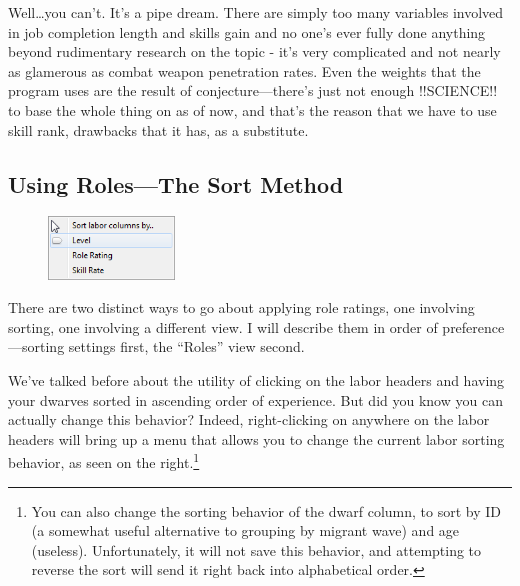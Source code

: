 \documentclass[]{article}
\begin{document}
Well\ldots you can't. It's a pipe dream. There are simply too many variables involved in job completion
length and skills gain and no one's ever fully done anything beyond rudimentary research on the topic -
it's very complicated and not nearly as glamerous as combat weapon penetration rates. Even the weights
that the program uses are the result of conjecture---there's just not enough !!SCIENCE!! to base the
whole thing on as of now, and that's the reason that we have to use skill rank, drawbacks that it has,
as a substitute.

\subsection{Using Roles---The Sort Method}
\label{sec:Using Roles}

\begin{figure}\vspace{-22pt}
  \begin{center}
    \includegraphics[width=0.3\textwidth]{Sec3Fig2}
  \end{center}
\vspace{-15pt}
\end{figure}
There are two distinct ways to go about applying role ratings, one involving sorting, one involving a
different view. I will describe them in order of preference---sorting settings first, the ``Roles'' view
second.

We've talked before about the utility of clicking on the labor headers and having your dwarves sorted in
ascending order of experience. But did you know you can actually change this behavior? Indeed,
right-clicking on anywhere on the labor headers will bring up a menu that allows you to change the
current labor sorting behavior, as seen on the right.\footnote{You can also change the sorting behavior
of the dwarf column, to sort by ID (a somewhat useful alternative to grouping by migrant wave) and age
(useless). Unfortunately, it will not save this behavior, and attempting to reverse the sort will send it
right back into alphabetical order.}
\end{document}
